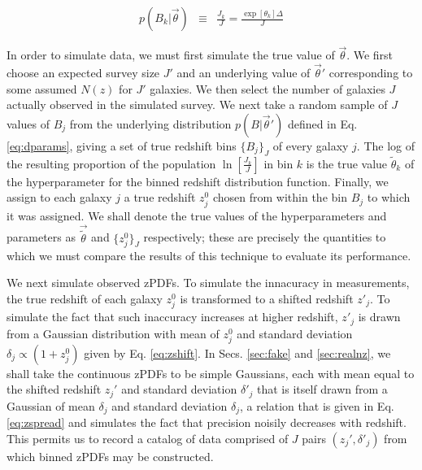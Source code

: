 \documentclass[preprint]{aastex}
\begin{document}
\begin{eqnarray}
\label{eq:dparams}
p(B_{k}|\vec{\theta}) &\equiv& \frac{J_{k}}{J} = \frac{\exp[\theta_{k}]\Delta}{J}
\end{eqnarray}

In order to simulate data, we must first simulate the true value of $\vec{\theta}$.  We first choose an expected survey size $J'$ and an underlying value of $\vec{\theta}'$ corresponding to some assumed $N(z)$ for $J'$ galaxies.  We then select the number of galaxies $J$ actually observed in the simulated survey.  We next take a random sample of $J$ values of $B_{j}$ from the underlying distribution $p(B|\vec{\theta}')$ defined in Eq. \ref{eq:dparams}, giving a set of true redshift bins $\{B_{j}\}_{J}$ of every galaxy $j$.  The log of the resulting proportion of the population $\ln[\frac{J_{k}}{J}]$ in bin $k$ is the true value $\tilde{\theta}_{k}$ of the hyperparameter for the binned redshift distribution function.  Finally, we assign to each galaxy $j$ a true redshift $z_{j}^{0}$ chosen from within the bin $B_{j}$ to which it was assigned.  We shall denote the true values of the hyperparameters and parameters as $\vec{\tilde{\theta}}$ and $\{z_{j}^{0}\}_{J}$ respectively; these are precisely the quantities to which we must compare the results of this technique to evaluate its performance.


We next simulate observed zPDFs.  To simulate the innacuracy in measurements, the true redshift of each galaxy $z_{j}^{0}$ is transformed to a shifted redshift $z'_{j}$.  To simulate the fact that such inaccuracy increases at higher redshift, $z'_{j}$ is drawn from a Gaussian distribution with mean of $z_{j}^{0}$ and standard deviation $\delta_{j}\propto(1+z_{j}^{0})$ given by Eq. \ref{eq:zshift}.  In Secs. \ref{sec:fake} and \ref{sec:realnz}, we shall take the continuous zPDFs to be simple Gaussians, each with mean equal to the shifted redshift $z_{j}'$ and standard deviation $\delta'_{j}$ that is itself drawn from a Gaussian of mean $\delta_{j}$ and standard deviation $\delta_{j}$, a relation that is given in Eq. \ref{eq:zspread} and simulates the fact that precision noisily decreases with redshift.  This permits us to record a catalog of data comprised of $J$ pairs $(z_{j}',\delta'_{j})$ from which binned zPDFs may be constructed.  %
\end{document}

